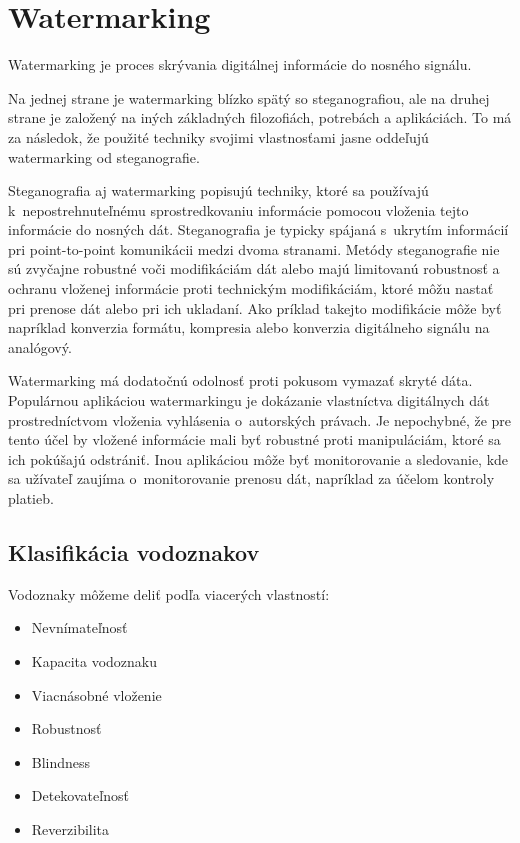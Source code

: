 \chapter{Watermarking}
\label{ch-watermarking}
Watermarking je proces skrývania digitálnej informácie do nosného signálu.

Na jednej strane je watermarking blízko spätý so steganografiou, ale na druhej strane je založený na iných základných filozofiách, potrebách a aplikáciách. To má za následok, že použité techniky svojimi vlastnosťami jasne oddeľujú watermarking od steganografie.

Steganografia aj watermarking popisujú techniky, ktoré sa používajú k~nepostrehnuteľnému sprostredkovaniu informácie pomocou vloženia tejto informácie do nosných dát. Steganografia je typicky spájaná s~ukrytím informácií pri point-to-point komunikácii medzi dvoma stranami. Metódy steganografie nie sú zvyčajne robustné voči modifikáciám dát alebo majú limitovanú robustnosť a ochranu vloženej informácie proti technickým modifikáciám, ktoré môžu nastať pri prenose dát alebo pri ich ukladaní. Ako príklad takejto modifikácie môže byť napríklad konverzia formátu, kompresia alebo konverzia digitálneho signálu na analógový.

Watermarking má dodatočnú odolnosť proti pokusom vymazať skryté dáta. Populárnou aplikáciou watermarkingu je dokázanie vlastníctva digitálnych dát prostredníctvom vloženia vyhlásenia o~autorských právach. Je nepochybné, že pre tento účel by vložené informácie mali byť  robustné proti manipuláciám, ktoré sa ich pokúšajú odstrániť. Inou aplikáciou môže byť monitorovanie a sledovanie, kde sa užívateľ zaujíma o~monitorovanie prenosu dát, napríklad za účelom kontroly platieb. \cite{Katzenbeisser}

\section{Klasifikácia vodoznakov}
Vodoznaky môžeme deliť podľa viacerých vlastností:
\begin{itemize}
\item Nevnímateľnosť
\item Kapacita vodoznaku
\item Viacnásobné vloženie
\item Robustnosť
\item Blindness
\item Detekovateľnosť
\item Reverzibilita
\end{itemize}

